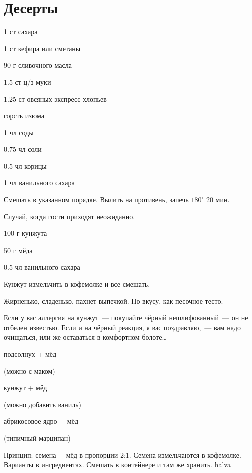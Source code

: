 \chapter*{Десерты}
\label{sec:sweet}



{
\item 1 ст сахара
\item 1 ст кефира или сметаны
\item 90 г сливочного масла
\item 1.5 ст ц/з муки
\item 1.25 ст овсяных экспресс хлопьев %
\item горсть изюма
}{
\item 1 чл соды
\item 0.75 чл соли
\item 0.5 чл корицы
\item 1 чл ванильного сахара
}{
Смешать в указанном порядке. Вылить на противень, запечь $180^{\circ}$ 20 мин.
}{
\begin{advice}
\item Случай, когда гости приходят неожиданно.
\end{advice}}{}



{\label{cookies}
\item 100 г кунжута 
\item 50 г мёда
}{
\item 0.5 чл ванильного сахара
}{
Кунжут измельчить в кофемолке и все смешать.
}{
\begin{advice}
    \item  Жирненько, сладенько, пахнет выпечкой. По вкусу, как песочное тесто.
\item Если у вас аллергия на кунжут~--- покупайте чёрный нешлифованный~— он не отбелен известью. Если и на чёрный реакция, я вас поздравляю,~— вам надо очищаться, или же оставаться в комфортном болоте\ldots

\end{advice}}{}



{


\item подсолнух + мёд

    (можно с маком)
\item кунжут + мёд 

    (можно добавить ваниль)
\item абрикосовое ядро + мёд 

    (типичный марципан)

}{%
\item[]
}{
Принцип: семена + мёд в пропорции 2:1. Семена измельчаются в кофемолке. Варианты в ингредиентах.
Смешать в контейнере и там же хранить.
}{}{halva}



